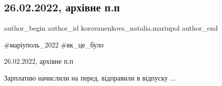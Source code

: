  
 
 
 
 

\subsection{26.02.2022, архівне п.п}
\label{sec:26_02_2023.fb.korovanenkova_natalia.mariupol.1.26_02_arhivne}

\ifcmt
 author_begin
   author_id korovanenkova_natalia.mariupol
 author_end
\fi

\#маріуполь\_2022 \#як\_це\_було

26.02.2022, архівне п.п

Зарплатню начислили на перед, відправили в відпуску ...
